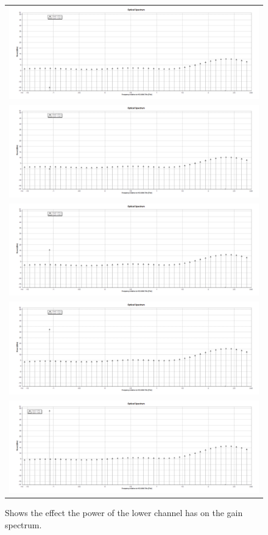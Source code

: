 \renewcommand{\arraystretch}{0.5}
\begin{figure}
    \centering
    \caption{Shows the effect the power of the lower channel has on the gain spectrum.}
    \begin{tabular}{c}
        \includegraphics[width=0.8\linewidth]{images/technical_work/section_1_characterisation/steps/1.png} \\
        \includegraphics[width=0.8\linewidth]{images/technical_work/section_1_characterisation/steps/3.png} \\
        \includegraphics[width=0.8\linewidth]{images/technical_work/section_1_characterisation/steps/5.png} \\
        \includegraphics[width=0.8\linewidth]{images/technical_work/section_1_characterisation/steps/7.png} \\
        \includegraphics[width=0.8\linewidth]{images/technical_work/section_1_characterisation/steps/9.png} \\ 
    \end{tabular}
    \label{fig:tw_amp_char_lc}
\end{figure}

